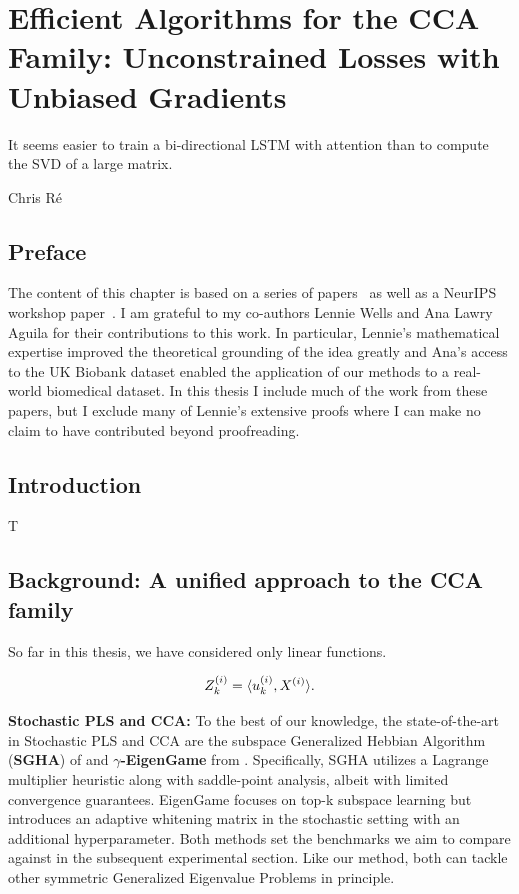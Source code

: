 \graphicspath{{chapters/gradient_descent/}}


\chapter{Efficient Algorithms for the CCA Family: Unconstrained Losses with Unbiased Gradients}\label{chap:gradient_descent}
\epigraph{It seems easier to train a bi-directional LSTM with attention than to compute the SVD of a large matrix.\cite{gemp}}{Chris Ré}
\minitoc
\section*{Preface}
The content of this chapter is based on a series of papers~\citep{chapman2022generalized, chapman2023efficient} as well as a NeurIPS workshop paper~\citep{chapman2023neurips}.
I am grateful to my co-authors Lennie Wells and Ana Lawry Aguila for their contributions to this work.
In particular, Lennie's mathematical expertise improved the theoretical grounding of the idea greatly and Ana's access to the UK Biobank dataset enabled the application of our methods to a real-world biomedical dataset.
In this thesis I include much of the work from these papers, but I exclude many of Lennie's extensive proofs where I can make no claim to have contributed beyond proofreading.

\section{Introduction}

T


\section{Background: A unified approach to the CCA family}\label{sec:background-unified}
So far in this thesis, we have considered only linear functions.

\begin{equation}
    \label{eq:cca-linear-function-def}
    Z^{(i)}_k = \langle u_k^{(i)} , X^{(i)} \rangle.
\end{equation}

\textbf{Stochastic PLS and CCA:}
To the best of our knowledge, the state-of-the-art in Stochastic PLS and CCA are the subspace Generalized Hebbian Algorithm (\textbf{SGHA}) of \cite{chen2019constrained} and \textbf{$\gamma$-EigenGame} from \cite{gemp20,gemp2021}. Specifically, SGHA utilizes a Lagrange multiplier heuristic along with saddle-point analysis, albeit with limited convergence guarantees. EigenGame focuses on top-k subspace learning but introduces an adaptive whitening matrix in the stochastic setting with an additional hyperparameter. Both methods set the benchmarks we aim to compare against in the subsequent experimental section. Like our method, both can tackle other symmetric Generalized Eigenvalue Problems in principle.


